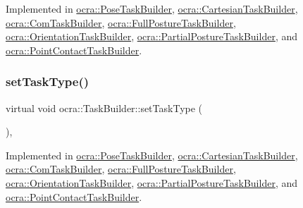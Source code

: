 Implemented in \hyperlink{classocra_1_1PoseTaskBuilder_a3bc6c07a3ee7656a1f3051500baddbd8}{ocra\+::\+Pose\+Task\+Builder}, \hyperlink{classocra_1_1CartesianTaskBuilder_a9e3175e5792c5ed9a7e3febbe458d21c}{ocra\+::\+Cartesian\+Task\+Builder}, \hyperlink{classocra_1_1ComTaskBuilder_ab514d4644f7dfeec3ae84a5b0b8bbc34}{ocra\+::\+Com\+Task\+Builder}, \hyperlink{classocra_1_1FullPostureTaskBuilder_a0f3852057b316baa402806fb320d257b}{ocra\+::\+Full\+Posture\+Task\+Builder}, \hyperlink{classocra_1_1OrientationTaskBuilder_ab30b211f4aa00ed4c78daae36aca6c42}{ocra\+::\+Orientation\+Task\+Builder}, \hyperlink{classocra_1_1PartialPostureTaskBuilder_a70b416b1666a772940d96338a317af0a}{ocra\+::\+Partial\+Posture\+Task\+Builder}, and \hyperlink{classocra_1_1PointContactTaskBuilder_a073506c0c849ad4ebd40aebef37f280d}{ocra\+::\+Point\+Contact\+Task\+Builder}.

\hypertarget{classocra_1_1TaskBuilder_a1a979fc495be6dc30483aa8fd0ff2650}{}\label{classocra_1_1TaskBuilder_a1a979fc495be6dc30483aa8fd0ff2650} 
\subsubsection{\texorpdfstring{set\+Task\+Type()}{setTaskType()}}
{\footnotesize\ttfamily virtual void ocra\+::\+Task\+Builder\+::set\+Task\+Type (\begin{DoxyParamCaption}{ }\end{DoxyParamCaption})\hspace{0.3cm}{\ttfamily [protected]}, {}}



Implemented in \hyperlink{classocra_1_1PoseTaskBuilder_aafc5b611352f7cbebecaa51cf534c68c}{ocra\+::\+Pose\+Task\+Builder}, \hyperlink{classocra_1_1CartesianTaskBuilder_a679842b95d6f7296a466636fd21bbbb8}{ocra\+::\+Cartesian\+Task\+Builder}, \hyperlink{classocra_1_1ComTaskBuilder_af9cfac995156297324ccbee1900f891c}{ocra\+::\+Com\+Task\+Builder}, \hyperlink{classocra_1_1FullPostureTaskBuilder_a5bae08175fd730b46004ddfccc9a1d8b}{ocra\+::\+Full\+Posture\+Task\+Builder}, \hyperlink{classocra_1_1OrientationTaskBuilder_a491f3d3db66afb5b5e3230983b4b15c9}{ocra\+::\+Orientation\+Task\+Builder}, \hyperlink{classocra_1_1PartialPostureTaskBuilder_acf2b5f880dc19e43356552b348d8a010}{ocra\+::\+Partial\+Posture\+Task\+Builder}, and \hyperlink{classocra_1_1PointContactTaskBuilder_a88d7c619f00708c1b3472ee7dc373f96}{ocra\+::\+Point\+Contact\+Task\+Builder}.



